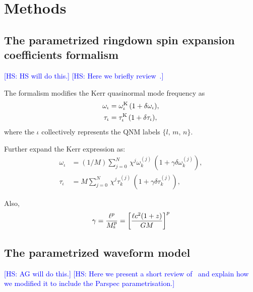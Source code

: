 \documentclass[twocolumn,prd,aps,superscriptaddress,preprintnumbers,tightenlines,showpacs,nofootinbib,eqsecnum,amsfonts,amsmath,longbibliography]{revtex4-1}
\newcommand{\hs}[1]{{\textcolor{blue}{{[HS: #1]}} }}
\begin{document}
\section{Methods}
\label{sec:method}

\subsection{The parametrized ringdown spin expansion coefficients formalism}
\label{sec:review_parspec}

\hs{HS will do this.}
\hs{Here we briefly review~\cite{Maselli:2019mjd,Carullo:2021dui}.}

The formalism modifies the Kerr quasinormal mode frequency as
%
\begin{subequations}
\begin{align}
\omega_{\iota} &= \omega^{\rm K}_{\iota} \, (1 + \delta \omega_{\iota}), \\
\tau_{\iota}   &= \tau^{\rm K}_{\iota}   \, (1 + \delta \tau_{\iota}),
\end{align}
\label{eq:general_deviation}
\end{subequations}
%
where the $\iota$ collectively represents the QNM labels $\{l,\, m,\, n\}$.

Further expand the Kerr expression as:
%
\begin{subequations}
\begin{align}
\omega_{\iota} &= (1/M) \sum_{j = 0}^{N} \, \chi^{j} \omega^{(j)}_{k} \, \left( 1 + \gamma \delta \omega^{(j)}_{k} \right), \\
\tau_{\iota}   &= M     \sum_{j = 0}^{N} \, \chi^{j} \tau^{(j)}_{k}   \, \left( 1 + \gamma \delta \tau^{(j)}_{k} \right),
\end{align}
\label{eq:kerr_expansion}
\end{subequations}

Also,
%
\begin{equation}
\gamma
%
= \frac{\ell^{p}}{M_{\rm s}^{p}}
%
%
= \left[
\frac{\ell c^2 (1 + z)}{G M}
\right]^{p}
\label{eq:def_gamma}
\end{equation}

\subsection{The parametrized waveform model}
\label{sec:review_pSEOB}

\hs{AG will do this.}
\hs{Here we present a short review of~\cite{Brito:2018rfr,Ghosh:2021mrv} and
explain how we modified it to include the {\sc Parspec} parametrisation.}
\end{document}
